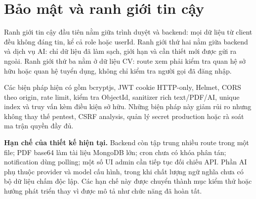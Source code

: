 \section{Bảo mật và ranh giới tin cậy}

Ranh giới tin cậy đầu tiên nằm giữa trình duyệt và backend: mọi dữ liệu từ client đều không đáng tin, kể cả role hoặc userId. Ranh giới thứ hai nằm giữa backend và dịch vụ AI: chỉ dữ liệu đã làm sạch, giới hạn và cần thiết mới được gửi ra ngoài. Ranh giới thứ ba nằm ở dữ liệu CV: route xem phải kiểm tra quan hệ sở hữu hoặc quan hệ tuyển dụng, không chỉ kiểm tra người gọi đã đăng nhập.

Các biện pháp hiện có gồm bcryptjs, JWT cookie HTTP-only, Helmet, CORS theo origin, rate limit, kiểm tra ObjectId, sanitizer rich text/PDF/AI, unique index và truy vấn kèm điều kiện sở hữu. Những biện pháp này giảm rủi ro nhưng không thay thế pentest, CSRF analysis, quản lý secret production hoặc rà soát ma trận quyền đầy đủ.

\noindent\textbf{Hạn chế của thiết kế hiện tại.}
Backend còn tập trung nhiều route trong một file; PDF base64 làm tài liệu MongoDB lớn; cron chưa có khóa phân tán; notification dùng polling; một số UI admin cần tiếp tục đối chiếu API. Phần AI phụ thuộc provider và model cấu hình, trong khi chất lượng ngữ nghĩa chưa có bộ dữ liệu chấm độc lập. Các hạn chế này được chuyển thành mục kiểm thử hoặc hướng phát triển thay vì được mô tả như chức năng đã hoàn tất.
